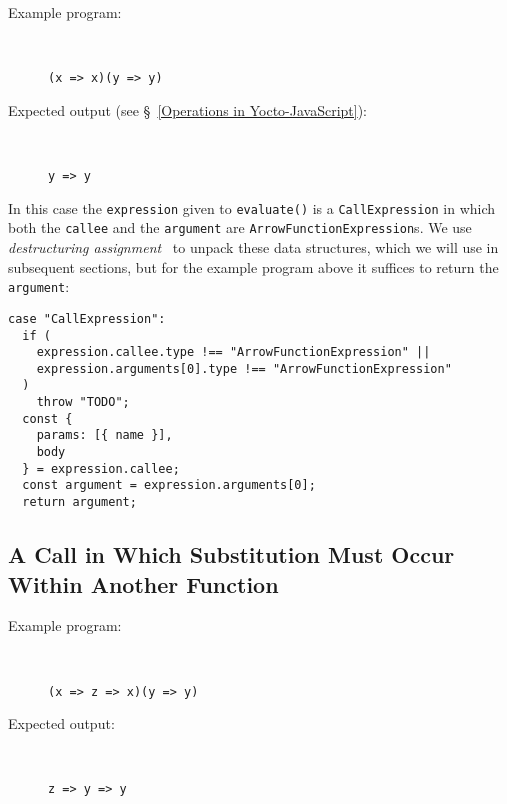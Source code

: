 \documentclass[12pt, oneside]{book}
\begin{document}
\begin{description}
\item [Example program:] ~

\begin{verbatim}
(x => x)(y => y)
\end{verbatim}

\item [Expected output (see §~\ref{Operations in Yocto-JavaScript}):] ~

\begin{verbatim}
y => y
\end{verbatim}
\end{description}

In this case the \texttt{expression} given to \texttt{evaluate()} is a \texttt{CallExpression} in which both the \texttt{callee} and the \texttt{argument} are \texttt{ArrowFunctionExpression}s. We use \emph{destructuring assignment}~\cite{destructuring-assignment} to unpack these data structures, which we will use in subsequent sections, but for the example program above it suffices to return the \texttt{argument}:

\begin{verbatim}
case "CallExpression":
  if (
    expression.callee.type !== "ArrowFunctionExpression" ||
    expression.arguments[0].type !== "ArrowFunctionExpression"
  )
    throw "TODO";
  const {
    params: [{ name }],
    body
  } = expression.callee;
  const argument = expression.arguments[0];
  return argument;
\end{verbatim}

\subsection{A Call in Which Substitution Must Occur Within Another Function}

\begin{description}
\item [Example program:] ~

\begin{verbatim}
(x => z => x)(y => y)
\end{verbatim}

\item [Expected output:] ~

\begin{verbatim}
z => y => y
\end{verbatim}
\end{description}
\end{document}
